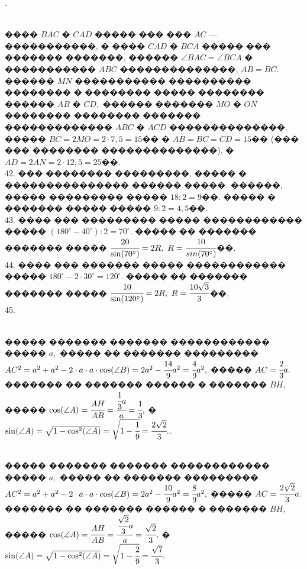 \documentclass[12pt]{article}
\begin{document}
. \begin{figure}[ht!]
\end{figure}\\
���� $BAC$ � $CAD$ ����� ��� ��� $AC$ --- �����������, � ���� $CAD$ � $BCA$ ����� ��� ������� �������, ������ $\angle BAC=\angle BCA$ � ����������� $ABC$ ��������������, $AB=BC.$ ������ $MN$ ����������� ���������� �������� � �������� ����� �������� ������ $AB$ � $CD,$ ������ ������� $MO$ � $ON$ �������� �������� ������� ������������� $ABC$ � $ACD$ ��������������. ����� $BC=2MO=2\cdot7,5=15$�� � $AB=BC=CD=15$�� (��� ��� �������� ��������������), � $AD=2AN=2\cdot12,5=25$��.\\
42. ��� �������� ���������, ����� � ��������������� ������ �����. ������, ����� ��������� ����� $18:2=9$��. ����� � ������� ����� ����� $9:2=4,5$��.\\
43. ���� ��� ��������� ����� ������������ ����� $(180^\circ-40^\circ):2=70^\circ.$ ����� �� ������� ������� ����� $\cfrac{20}{\sin(70^\circ)}=2R,\ R=\cfrac{10}{sin(70^\circ)}$��.\\
44. ���� ��� ������� ����� ������������ ����� $180^\circ-2\cdot30^\circ=120^\circ.$ ����� �� ������� ������� ����� $\cfrac{10}{\sin(120^\circ)}=2R,\ R=\cfrac{10\sqrt{3}}{3}$��.\\
45. \begin{figure}[ht!]
\end{figure}\\
����� ������� ������� ������������ ����� $a,$ ����� �� ������� ��������� $AC^2=a^2+a^2-2\cdot a\cdot a\cdot \cos(\angle B)=2a^2-\cfrac{14}{9}a^2=\cfrac{4}{9}a^2,$
����� $AC=\cfrac{2}{3}a.$ ������� �� ������� ������ � ������� $BH,$ ����� $\cos(\angle A)=\cfrac{AH}{AB}=\cfrac{\cfrac{1}{3}a}{a}=\cfrac{1}{3},$
� $\sin(\angle A)=\sqrt{1-\cos^2(\angle A)}=\sqrt{1-\cfrac{1}{9}}=\cfrac{2\sqrt{2}}{3}.$\newpage{}. \begin{figure}[ht!]
\end{figure}\\
����� ������� ������� ������������ ����� $a,$ ����� �� ������� ��������� $AC^2=a^2+a^2-2\cdot a\cdot a\cdot \cos(\angle B)=2a^2-\cfrac{10}{9}a^2=\cfrac{8}{9}a^2,$
����� $AC=\cfrac{2\sqrt{2}}{3}a.$ ������� �� ������� ������ � ������� $BH,$ ����� $\cos(\angle A)=\cfrac{AH}{AB}=\cfrac{\cfrac{\sqrt{2}}{3}a}{a}=\cfrac{\sqrt{2}}{3},$
� $\sin(\angle A)=\sqrt{1-\cos^2(\angle A)}=\sqrt{1-\cfrac{2}{9}}=\cfrac{\sqrt{7}}{3}.$\\
\end{document}
